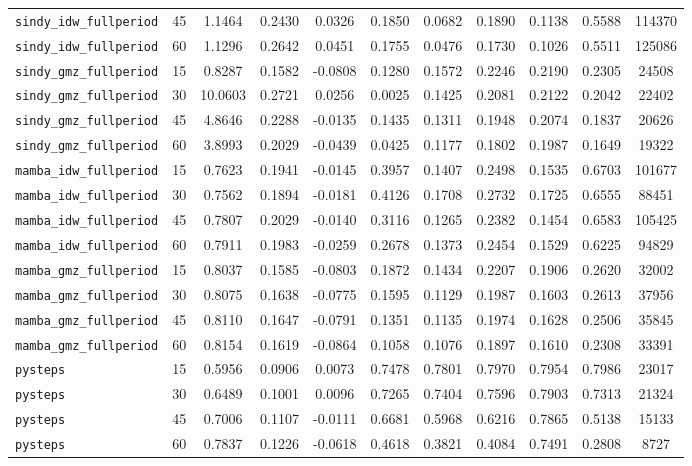 \documentclass[12pt, a4paper]{article}
\begin{document}
{\begin{longtable}{p{4.0cm}cccccccccc}
\texttt{sindy\_idw\_fullperiod} & 45 & 1.1464 & 0.2430 & 0.0326 & 0.1850 & 0.0682 & 0.1890 & 0.1138 & 0.5588 & 114370 \\
\texttt{sindy\_idw\_fullperiod} & 60 & 1.1296 & 0.2642 & 0.0451 & 0.1755 & 0.0476 & 0.1730 & 0.1026 & 0.5511 & 125086 \\
\addlinespace[1pt]
\texttt{sindy\_gmz\_fullperiod} & 15 & 0.8287 & 0.1582 & -0.0808 & 0.1280 & 0.1572 & 0.2246 & 0.2190 & 0.2305 & 24508 \\
\texttt{sindy\_gmz\_fullperiod} & 30 & 10.0603 & 0.2721 & 0.0256 & 0.0025 & 0.1425 & 0.2081 & 0.2122 & 0.2042 & 22402 \\
\texttt{sindy\_gmz\_fullperiod} & 45 & 4.8646 & 0.2288 & -0.0135 & 0.1435 & 0.1311 & 0.1948 & 0.2074 & 0.1837 & 20626 \\
\texttt{sindy\_gmz\_fullperiod} & 60 & 3.8993 & 0.2029 & -0.0439 & 0.0425 & 0.1177 & 0.1802 & 0.1987 & 0.1649 & 19322 \\
\addlinespace[1pt]
\texttt{mamba\_idw\_fullperiod} & 15 & 0.7623 & 0.1941 & -0.0145 & 0.3957 & 0.1407 & 0.2498 & 0.1535 & 0.6703 & 101677 \\
\texttt{mamba\_idw\_fullperiod} & 30 & 0.7562 & 0.1894 & -0.0181 & 0.4126 & 0.1708 & 0.2732 & 0.1725 & 0.6555 & 88451 \\
\texttt{mamba\_idw\_fullperiod} & 45 & 0.7807 & 0.2029 & -0.0140 & 0.3116 & 0.1265 & 0.2382 & 0.1454 & 0.6583 & 105425 \\
\texttt{mamba\_idw\_fullperiod} & 60 & 0.7911 & 0.1983 & -0.0259 & 0.2678 & 0.1373 & 0.2454 & 0.1529 & 0.6225 & 94829 \\
\addlinespace[1pt]
\texttt{mamba\_gmz\_fullperiod} & 15 & 0.8037 & 0.1585 & -0.0803 & 0.1872 & 0.1434 & 0.2207 & 0.1906 & 0.2620 & 32002 \\
\texttt{mamba\_gmz\_fullperiod} & 30 & 0.8075 & 0.1638 & -0.0775 & 0.1595 & 0.1129 & 0.1987 & 0.1603 & 0.2613 & 37956 \\
\texttt{mamba\_gmz\_fullperiod} & 45 & 0.8110 & 0.1647 & -0.0791 & 0.1351 & 0.1135 & 0.1974 & 0.1628 & 0.2506 & 35845 \\
\texttt{mamba\_gmz\_fullperiod} & 60 & 0.8154 & 0.1619 & -0.0864 & 0.1058 & 0.1076 & 0.1897 & 0.1610 & 0.2308 & 33391 \\
\addlinespace[1pt]
\texttt{pysteps} & 15 & 0.5956 & 0.0906 & 0.0073 & 0.7478 & 0.7801 & 0.7970 & 0.7954 & 0.7986 & 23017 \\
\texttt{pysteps} & 30 & 0.6489 & 0.1001 & 0.0096 & 0.7265 & 0.7404 & 0.7596 & 0.7903 & 0.7313 & 21324 \\
\texttt{pysteps} & 45 & 0.7006 & 0.1107 & -0.0111 & 0.6681 & 0.5968 & 0.6216 & 0.7865 & 0.5138 & 15133 \\
\texttt{pysteps} & 60 & 0.7837 & 0.1226 & -0.0618 & 0.4618 & 0.3821 & 0.4084 & 0.7491 & 0.2808 & 8727 \\
\end{longtable}
}
\end{document}
